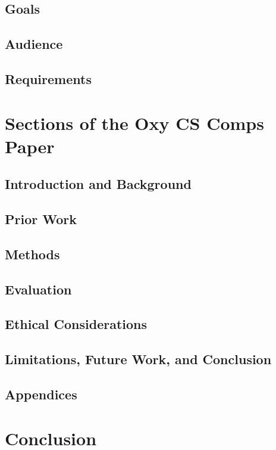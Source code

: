 \documentclass[10pt,twocolumn]{article}
\begin{document}
\subsection{Goals}

\subsection{Audience}

\subsection{Requirements}

\section{Sections of the Oxy CS Comps Paper}

\subsection{Introduction and Background}

\subsection{Prior Work}

\subsection{Methods}

\subsection{Evaluation}

\subsection{Ethical Considerations}

\subsection{Limitations, Future Work, and Conclusion}

\subsection{Appendices}

\section{Conclusion}

\printbibliography 
\end{document}
